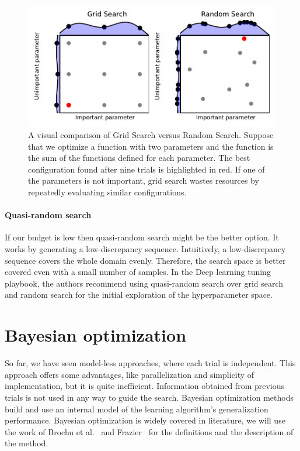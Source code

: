 \begin{figure}[H]
    \centering
    \includegraphics[scale=0.8]{img/grid_vs_rs.pdf}
    \caption{A visual comparison of Grid Search versus Random Search. Suppose that we optimize a function with two parameters and the function is the sum of the functions defined for each parameter. The best configuration found after nine trials is highlighted in red. If one of the parameters is not important, grid search wastes resources by repeatedly evaluating similar configurations. }
    \label{fig:grid}
\end{figure}

\paragraph{Quasi-random search} If our budget is low then quasi-random search might be the better option. It works by generating a low-discrepancy sequence. Intuitively, a low-discrepancy sequence covers the whole domain evenly. Therefore, the search space is better covered even with a small number of samples. In the Deep learning tuning playbook, the authors recommend using quasi-random search over grid search and random search for the initial exploration of the hyperparameter space.



\section{Bayesian optimization}
So far, we have seen model-less approaches, where each trial is independent. This approach offers some advantages, like parallelization and simplicity of implementation, but it is quite inefficient. Information obtained from previous trials is not used in any way to guide the search. Bayesian optimization methods build and use an internal model of the learning algorithm's generalization performance. Bayesian optimization is widely covered in literature, we will use the work of Brochu et al.~\cite{brochu2010tutorial} and Frazier~\cite{frazier2018tutorial} for the definitions and the description of the method.

